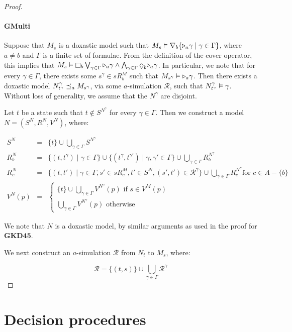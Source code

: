 \begin{proof}
\paragraph{GMulti} Suppose that $M_s$ is a doxastic model such that $M_s
\vDash \nabla_b \{ {\mathopen{\triangleright}}_a \gamma \mid \gamma \in \Gamma\}$, where $a \ne
b$ and $\Gamma$ is a finite set of formulae. From the definition of the cover
operator, this implies that $M_s \entails \knows_b \bigvee_{\gamma \in \Gamma}
\somerefs_a \gamma \land \bigwedge_{\gamma \in \Gamma} \suspects_b \somerefs_a
\gamma$. In particular, we note that for every $\gamma \in \Gamma$, there exists
some $s^\gamma \in sR^M_b$ such that $M_{s^\gamma} \vDash {\ensuremath{\mathopen{\triangleright}}}_a \gamma$.
Then there exists a doxastic model $N^\gamma_{t^\gamma} \preceq_a
M_{s^\gamma}$, via some $a$-simulation $\mathcal{R}$, such that
$N^\gamma_{t^\gamma} \vDash \gamma$. Without loss of generality, we assume
that the $N^\gamma$ are disjoint.

Let $t$ be a state such that $t \notin S^{N^\gamma}$ for every $\gamma \in
\Gamma$. Then we construct a model $N = (S^N, R^N, V^N)$, where:

\begin{eqnarray*}
S^N &=& \{t\} \cup \bigcup_{\gamma \in \Gamma} S^{N^\gamma}\\
R^N_b &=& \{(t, t^\gamma) \mid \gamma \in \Gamma\} \cup \{(t^\gamma,
t^{\gamma'}) \mid \gamma, \gamma' \in \Gamma\} \cup \bigcup_{\gamma \in \Gamma}
R^{N^\gamma}_b\\
R^N_c &=& \{(t, t') \mid \gamma \in \Gamma, s' \in sR^M_c, t' \in S^N, (s', t')
\in \mathcal{R}^\gamma\} \cup \bigcup_{\gamma \in \Gamma} R^{N^\gamma}_c \text{
for $c \in A - \{b\}$}\\
V^N(p) &=& \begin{cases}
\{t\} \cup \bigcup_{\gamma \in \Gamma} V^{N^\gamma}(p) \text{ if $s \in
V^M(p)$}\\
\bigcup_{\gamma \in \Gamma} V^{N^\gamma}(p) \text{ otherwise}
\end{cases}
\end{eqnarray*}

We note that $N$ is a doxastic model, by similar arguments as used in the proof
for {\bf GKD45}.

We next construct an $a$-simulation $\mathcal{R}$ from $N_t$ to $M_s$, where:

$$\mathcal{R} = \{(t, s)\} \cup \bigcup_{\gamma \in \Gamma} \mathcal{R}^\gamma$$


\end{proof}

\section{Decision procedures}
